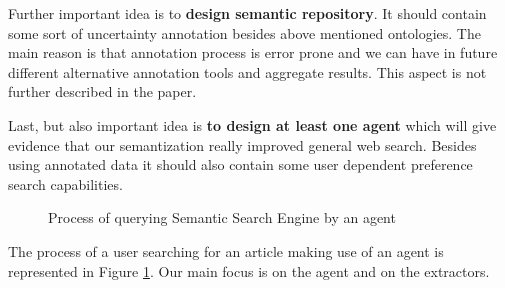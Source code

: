 \documentclass{sig-alternate}
\begin{document}
Further important idea is to \textbf{design semantic repository}. It should contain some sort of uncertainty annotation besides above mentioned ontologies. The main reason is that annotation process is error prone and we can have in future different alternative annotation tools and aggregate results. This aspect is not further described in the paper.\par

Last, but also important idea is \textbf{ to design at least one agent} which will give evidence that our semantization really improved general web search. Besides using annotated data it should also contain some user dependent preference search capabilities.


\begin{figure}
\centering
{}
\caption{Process of querying Semantic Search Engine by an agent}
\label{img:UserSearch}
\end{figure}
 
The process of a user searching for an article making use of an agent is represented in Figure \ref{img:UserSearch}. Our main focus is on the agent and on the extractors.



 
\end{document}
